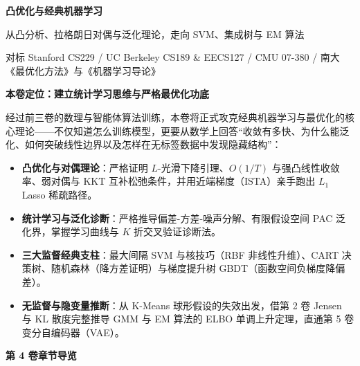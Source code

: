 \documentclass[UTF8,10.5pt,a4paper,oneside,fontset=fandol,scheme=plain]{ctexbook}
\begin{document}
{\fontsize{25}{33}\selectfont\sffamily\bfseries\color{ink}凸优化与经典机器学习}\par
\vspace{2.5mm}
{\large\sffamily\color{teal}从凸分析、拉格朗日对偶与泛化理论，走向 SVM、集成树与 EM 算法}\par
\vspace{4.5mm}
{\small\color{slate}对标 Stanford CS229 / UC Berkeley CS189 \& EECS127 / CMU 07-380 / 南大《最优化方法》与《机器学习导论》}\par

\vspace{5.5mm}

\begin{tcolorbox}[
  enhanced,
  colback=tealLight,
  colframe=tealLine,
  borderline west={2.6pt}{0pt}{tealDark},
  arc=2mm,
  boxrule=0.5pt,
  left=4.5mm,right=4.5mm,top=3mm,bottom=3mm
]
\textbf{\sffamily\color{tealDark}本卷定位：建立统计学习思维与严格最优化功底}\par\vspace{1.2mm}
\small
经过前三卷的数理与智能体算法训练，本卷将正式攻克经典机器学习与最优化的核心理论——不仅知道怎么训练模型，更要从数学上回答“收敛有多快、为什么能泛化、如何突破线性边界以及怎样在无标签数据中发现隐藏结构”：
\begin{itemize}
  \item \textbf{凸优化与对偶理论}：严格证明 $L$-光滑下降引理、$O(1/T)$ 与强凸线性收敛率、弱对偶与 KKT 互补松弛条件，并用近端梯度（ISTA）亲手跑出 $L_1$ Lasso 稀疏路径。
  \item \textbf{统计学习与泛化诊断}：严格推导偏差-方差-噪声分解、有限假设空间 PAC 泛化界，掌握学习曲线与 $K$ 折交叉验证诊断法。
  \item \textbf{三大监督经典支柱}：最大间隔 SVM 与核技巧（RBF 非线性升维）、CART 决策树、随机森林（降方差证明）与梯度提升树 GBDT（函数空间负梯度降偏差）。
  \item \textbf{无监督与隐变量推断}：从 K-Means 球形假设的失效出发，借第 2 卷 Jensen 与 KL 散度完整推导 GMM 与 EM 算法的 ELBO 单调上升定理，直通第 5 卷变分自编码器（VAE）。
\end{itemize}
\end{tcolorbox}

\vspace{4.5mm}

\noindent\textbf{\sffamily\color{tealDark}第 4 卷章节导览}
\vspace{1.5mm}
\end{document}
